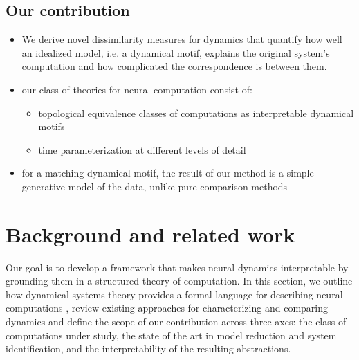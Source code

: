 \documentclass{article}
\theoremstyle{definition} \newtheorem{definition}{Definition}  \newtheorem{example}{Example}
\theoremstyle{remark} \newtheorem{remark}{Remark}
\newcounter{ct}
\begin{document}
\subsection{Our contribution}\label{sec:contribution}
\begin{itemize}
\item We derive novel dissimilarity measures for dynamics that quantify how well an idealized model, i.e. a dynamical motif, explains the original system’s computation and how complicated the correspondence is between them.
\item our class of theories for neural computation consist of:
	\begin{itemize}
\item topological equivalence classes of computations as interpretable dynamical motifs
\item time parameterization at different levels of detail
\end{itemize}
\item for a matching dynamical motif, the result of our method is a simple generative model of the data, unlike pure comparison methods
\end{itemize}



\section{Background and related work}\label{sec:background}
Our goal is to develop a framework that makes neural dynamics interpretable by grounding them in a structured theory of computation.
In this section, we outline how dynamical systems theory provides a formal language for describing neural computations \citep{jaeger2021theory, jaeger2023timescales, elgazzar2024universal}, review existing approaches for characterizing and comparing dynamics %
and define the scope of our contribution across three axes: the class of computations under study, the state of the art in model reduction and system identification, and the interpretability of the resulting abstractions.
\end{document}
